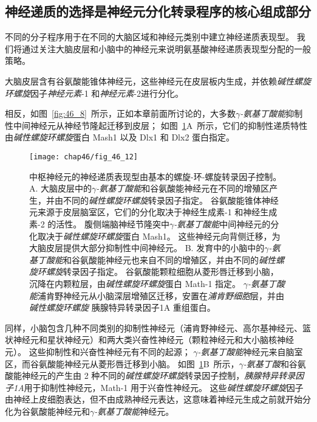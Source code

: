 \subsection{神经递质的选择是神经元分化转录程序的核心组成部分}

不同的分子程序用于在不同的大脑区域和神经元类别中建立神经递质表现型。
我们将通过关注大脑皮层和小脑中的神经元来说明氨基酸神经递质表现型分配的一般策略。



大脑皮层含有谷氨酸能锥体神经元，这些神经元在皮层板内生成，并依赖\textit{碱性螺旋环螺旋}因子\textit{神经元素}-1 和\textit{神经元素}-2进行分化。

相反，如图~\ref{fig:46_8}~所示，正如本章前面所讨论的，大多数\textit{$\gamma$-氨基丁酸能}抑制性中间神经元从神经节隆起迁移到皮层；
如图~\ref{fig:46_12}A~所示，它们的抑制性递质特性由\textit{碱性螺旋环螺旋}蛋白 Mash1 以及 Dlx1 和 Dlx2 蛋白指定。


\begin{figure}[htbp]
	\centering
	\texttt{[image: chap46/fig\_46\_12]}
	\caption{中枢神经元的神经递质表现型由基本的螺旋-环-螺旋转录因子控制。
		A. 大脑皮层中的\textit{$\gamma$-氨基丁酸能}和谷氨酸能神经元在不同的增殖区产生，并由不同的\textit{碱性螺旋环螺旋}转录因子指定。
		谷氨酸能锥体神经元来源于皮层脑室区，它们的分化取决于神经生成素-1 和神经生成素-2 的活性。
		腹侧端脑神经节隆突中\textit{$\gamma$-氨基丁酸能}中间神经元的分化取决于\textit{碱性螺旋环螺旋}蛋白 Mash1。
		这些神经元向背侧迁移，为大脑皮层提供大部分抑制性中间神经元。
		B. 发育中的小脑中的\textit{$\gamma$-氨基丁酸能}和谷氨酸能神经元也来自不同的增殖区，并由不同的\textit{碱性螺旋环螺旋}转录因子指定。
		谷氨酸能颗粒细胞从菱形唇迁移到小脑，沉降在内颗粒层，由\textit{碱性螺旋环螺旋}蛋白 Math-1 指定。
		\textit{$\gamma$-氨基丁酸能}浦肯野神经元从小脑深层增殖区迁移，安置在\textit{浦肯野细胞}层，并由\textit{碱性螺旋环螺旋} 胰腺特异转录因子1Α 重组蛋白。}
	\label{fig:46_12}
\end{figure}


同样，小脑包含几种不同类别的抑制性神经元（浦肯野神经元、高尔基神经元、篮状神经元和星状神经元）和两大类兴奋性神经元（颗粒神经元和大小脑核神经元）。
这些抑制性和兴奋性神经元有不同的起源；
\textit{$\gamma$-氨基丁酸能}神经元来自脑室区，而谷氨酸能神经元从菱形唇迁移到小脑。
如图~\ref{fig:46_12}B~所示，\textit{$\gamma$-氨基丁酸}和谷氨酸能神经元的产生由 2 种不同的\textit{碱性螺旋环螺旋}转录因子控制，\textit{胰腺特异转录因子1Α}用于抑制性神经元，Math-1 用于兴奋性神经元。
这些\textit{碱性螺旋环螺旋}因子由神经上皮细胞表达，但不由成熟神经元表达，这意味着神经元生成之前就开始分化为谷氨酸能神经元和\textit{$\gamma$-氨基丁酸能}神经元。


